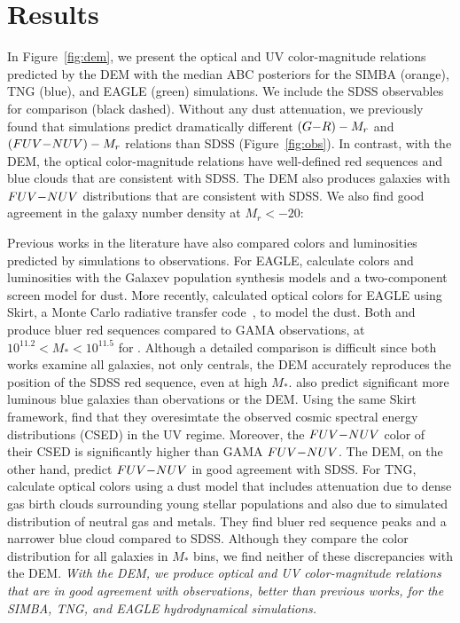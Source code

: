 \section{Results} \label{sec:results}
In Figure~\ref{fig:dem}, we present the optical and UV color-magnitude
relations predicted by the DEM with the median ABC posteriors for the SIMBA
(orange), TNG (blue), and EAGLE (green) simulations. We include the SDSS
observables for comparison (black dashed). Without any dust attenuation, we
previously found that simulations predict dramatically different $(G{-}R) - M_r$
and $(FUV{-}NUV) - M_r$ relations than SDSS (Figure~\ref{fig:obs}). In contrast,
with the DEM, the optical color-magnitude relations have well-defined red
sequences and blue clouds that are consistent with SDSS. The DEM also produces
galaxies with $FUV{-}NUV$ distributions that are consistent with SDSS. We
also find good agreement in the galaxy number density at $M_r < -20$:

Previous works in the literature have also compared colors and luminosities
predicted by simulations to observations. For EAGLE, \cite{trayford2015}
calculate colors and luminosities with the {\sc Galaxev} population synthesis
models and a two-component screen model for dust. More recently,
\cite{trayford2017} calculated optical colors for EAGLE using {\sc Skirt}, a
Monte Carlo radiative transfer code~\citep{camps2015}, to model the dust.
Both \cite{trayford2015} and \cite{trayford2017} produce bluer red sequences
compared to GAMA observations, at $10^{11.2} < M_* < 10^{11.5}$ for 
\cite{trayford2017}. Although a detailed comparison is difficult since both works
examine all galaxies, not only centrals, the DEM accurately reproduces the 
position of the SDSS red sequence, even at high $M_*$. \cite{trayford2015} 
also predict significant more luminous blue galaxies than obervations or the DEM. 
Using the same \cite{trayford2017} {\sc Skirt} framework, \cite{baes2019} find
that they overesimtate the observed cosmic spectral energy distributions 
(CSED) in the UV regime. Moreover, the $FUV{-}NUV$ color of their CSED is
significantly higher than GAMA $FUV{-}NUV$. The DEM, on the other hand, 
predict $FUV{-}NUV$ in good agreement with SDSS. 
For TNG, \cite{nelson2018} calculate optical colors using a dust model that
includes attenuation due to dense gas birth clouds surrounding young stellar
populations and also due to simulated distribution of neutral gas and metals.
They find bluer red sequence peaks and a narrower blue cloud compared to SDSS.
Although they compare the color distribution for all galaxies in $M_*$ bins,
we find neither of these discrepancies with the DEM. 
\emph{With the DEM, we produce optical and UV color-magnitude relations that
are in good agreement with observations, better than previous works, for the
SIMBA, TNG, and EAGLE hydrodynamical simulations.}

